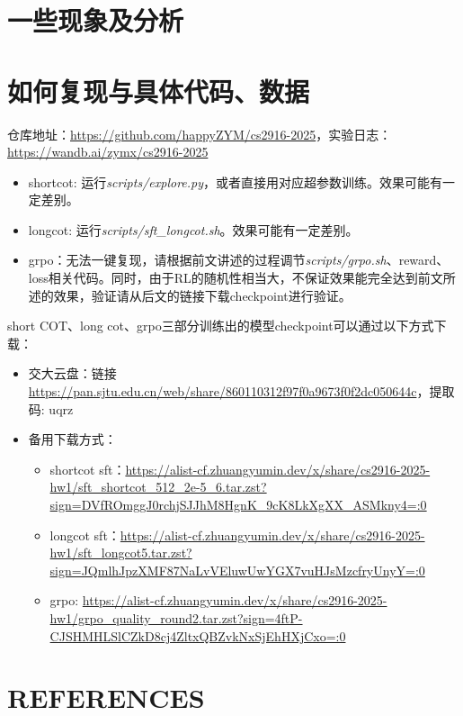 \documentclass[12pt,hyperref,a4paper,UTF8]{ctexart}
\begin{document}
	\section{一些现象及分析}
	
	\newpage
	\appendix
	\section{如何复现与具体代码、数据}
	仓库地址：\url{https://github.com/happyZYM/cs2916-2025}，实验日志：\url{https://wandb.ai/zymx/cs2916-2025}
	\begin{itemize}
		\item shortcot: 运行\textit{scripts/explore.py}，或者直接用对应超参数训练。效果可能有一定差别。
		\item longcot: 运行\textit{scripts/sft\_longcot.sh}。效果可能有一定差别。
		\item grpo：无法一键复现，请根据前文讲述的过程调节\textit{scripts/grpo.sh}、reward、loss相关代码。同时，由于RL的随机性相当大，不保证效果能完全达到前文所述的效果，验证请从后文的链接下载checkpoint进行验证。
	\end{itemize}
	short COT、long cot、grpo三部分训练出的模型checkpoint可以通过以下方式下载：

	\begin{itemize}
		\item 交大云盘：链接\url{https://pan.sjtu.edu.cn/web/share/860110312f97f0a9673f0f2dc050644c}，提取码: uqrz
		\item 备用下载方式：
		\begin{itemize}
			\item shortcot sft：\url{https://alist-cf.zhuangyumin.dev/x/share/cs2916-2025-hw1/sft_shortcot_512_2e-5_6.tar.zst?sign=DVfROmggJ0rchjSJJhM8HgnK_9cK8LkXgXX_ASMkny4=:0}
			\item longcot sft：\url{https://alist-cf.zhuangyumin.dev/x/share/cs2916-2025-hw1/sft_longcot5.tar.zst?sign=JQmlhJpzXMF87NaLvVEluwUwYGX7vuHJsMzcfryUnyY=:0}
			\item grpo: \url{https://alist-cf.zhuangyumin.dev/x/share/cs2916-2025-hw1/grpo_quality_round2.tar.zst?sign=4ftP-CJSHMHLSlCZkD8cj4ZltxQBZvkNxSjEhHXjCxo=:0}
		\end{itemize}
	\end{itemize}
	\section{REFERENCES}
	\nocite{*}
	\printbibliography[heading=none]
	
	
\end{document}
